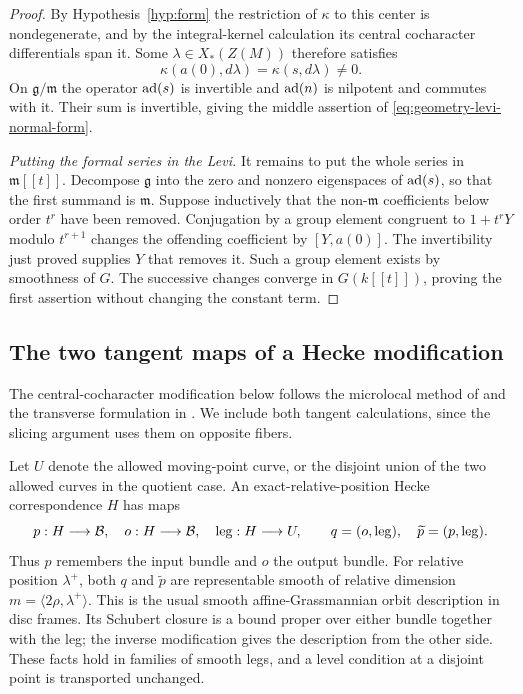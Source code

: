 \begin{proof}
By Hypothesis~\ref{hyp:form} the restriction of $\kappa$ to
this center is nondegenerate, and by the integral-kernel calculation
its central cocharacter differentials span it.  Some
$\lambda\in X_*(Z(M))$ therefore satisfies
\[
             \kappa(a(0),d\lambda)
                    =\kappa(s,d\lambda)\ne0.
\]
On $\mathfrak g/\mathfrak m$ the operator $\operatorname{ad}(s)$ is invertible and
$\operatorname{ad}(n)$ is nilpotent and commutes with it.  Their sum is invertible,
giving the middle assertion of
\eqref{eq:geometry-levi-normal-form}.

\emph{Putting the formal series in the Levi.}
It remains to put the whole series in $\mathfrak m[[t]]$.  Decompose
$\mathfrak g$ into the zero and nonzero eigenspaces of $\operatorname{ad}(s)$,
so that the first summand is $\mathfrak m$.  Suppose inductively that
the non-$\mathfrak m$ coefficients below order $t^r$ have been removed.
Conjugation by a group element congruent to $1+t^rY$ modulo $t^{r+1}$
changes the offending coefficient by $[Y,a(0)]$.  The invertibility
just proved supplies $Y$ that removes it.  Such a group element exists
by smoothness of $G$.  The successive changes converge in $G(k[[t]])$,
proving the first assertion without changing the constant term.
\end{proof}

\subsection{The two tangent maps of a Hecke modification}

The central-cocharacter modification below follows the microlocal method of
\cite[Sections~20.5 and~20.7--20.8]{AGKRRV} and the transverse formulation
in \cite[Proposition~4.2]{OpenAIFullSupport2026}. We include both tangent
calculations, since the slicing argument uses them on opposite fibers.

Let $U$ denote the allowed moving-point curve, or the disjoint union of
the two allowed curves in the quotient case.  An exact-relative-position
Hecke correspondence $H$ has maps
\[
 p:H\longrightarrow\mathcal B,\quad o:H\longrightarrow\mathcal B,\quad
 \operatorname{leg}:H\longrightarrow U,
 \qquad q=(o,\operatorname{leg}),\quad
 \widetilde p=(p,\operatorname{leg}).
\]
Thus $p$ remembers the input bundle and $o$ the output bundle.
For relative position $\lambda^+$, both $q$ and $\widetilde p$ are
representable smooth of relative dimension
$m=\langle2\rho,\lambda^+\rangle$.  This is the usual smooth
affine-Grassmannian orbit description in disc frames.  Its Schubert
closure is a bound proper over either bundle together with the leg;
the inverse modification gives the description from the other side.
These facts hold in families of smooth legs, and a level condition at
a disjoint point is transported unchanged.

